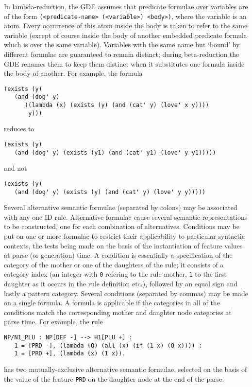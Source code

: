 In lambda-reduction, the GDE assumes that predicate formulae over
variables are of the form {\tt (<predicate-name> (<variable>) <body>)},
where the variable is an atom. Every occurrence of this atom inside the
body is taken to refer to the same variable (except of course inside
the body of another embedded predicate formula which is over the
same variable).
Variables with the same name but `bound' by different formulae are
guaranteed to remain distinct; during beta-reduction the GDE renames
them to keep them distinct when it substitutes one formula inside the
body of another. For example, the formula
\begin{ex}
\begin{verbatim}
(exists (y)
   (and (dog' y)
      ((lambda (x) (exists (y) (and (cat' y) (love' x y))))
       y)))
\end{verbatim}
\end{ex}
reduces to
\begin{ex}
\begin{verbatim}
(exists (y)
   (and (dog' y) (exists (y1) (and (cat' y1) (love' y y1)))))
\end{verbatim}
\end{ex}
and not
\begin{ex}
\begin{verbatim}
(exists (y)
   (and (dog' y) (exists (y) (and (cat' y) (love' y y)))))
\end{verbatim}
\end{ex}

Several alternative semantic formulae (separated by colons) may be
associated with any one ID rule. Alternative formulae cause
several semantic representations to be constructed, one for each
combination of alternatives. Conditions may be put on one or more
formulae to restrict their applicability to particular syntactic
contexts, the tests being made on the basis of the instantiation
of feature values at parse (or generation) time. A condition is
essentially a specification of the category of the mother or one of the
daughters of the rule; it consists of a category index (an integer with
{\tt 0} refering to the rule mother, {\tt 1} to the first daughter
as it occurs in the rule definition etc.), followed by an equal
sign and lastly a pattern category. Several conditions (separated
by commas) may be made on a single formula. A formula is applicable
if the categories in all of the conditions match the corresponding
mother and daughter node categories at parse time. For example, the rule
\begin{ex}
\begin{verbatim}
NP/N1_PLU : NP[DEF -] --> H1[PLU +] : 
   1 = [PRD -], (lambda (Q) (all (x) (if (1 x) (Q x)))) : 
   1 = [PRD +], (lambda (x) (1 x)).
\end{verbatim}
\end{ex}
has two mutually-exclusive alternative semantic formulae, selected on
the basis of the value of the feature {\tt PRD} on the daughter node
at the end of the parse.

